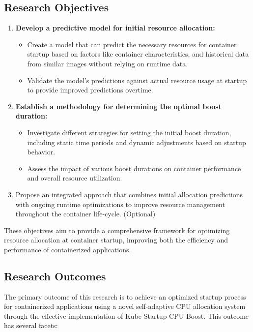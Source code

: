 \subsection{Research Objectives}
\vspace{12pt}
\begin{enumerate}
    \item \textbf{Develop a predictive model for initial resource allocation:}

\begin{itemize}
    \item Create a model that can predict the necessary resources for container startup based on factors like container characteristics, and historical data from similar images without relying on runtime data.
    \item Validate the model’s predictions against actual resource usage at startup to provide improved predictions overtime.
\end{itemize}

    \item \textbf{Establish a methodology for determining the optimal boost duration:}

\begin{itemize}
    \item Investigate different strategies for setting the initial boost duration, including static time periods and dynamic adjustments based on startup behavior.
    \item Assess the impact of various boost durations on container performance and overall resource utilization.
    
\end{itemize}

\item Propose an integrated approach that combines initial allocation predictions with ongoing runtime optimizations\cite{tran2022survey} to improve resource management throughout the container life-cycle. (Optional)
\end{enumerate}

\vspace{12pt}
These objectives aim to provide a comprehensive framework for optimizing resource allocation at container startup, improving both the efficiency and performance of containerized applications.



\vspace{12pt}

\subsection{Research Outcomes}
\vspace{12pt}
The primary outcome of this research is to achieve an optimized startup process for containerized applications using a novel self-adaptive CPU allocation system through the effective implementation of Kube Startup CPU Boost. This outcome has several facets:

